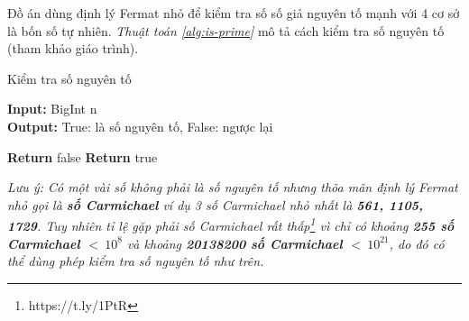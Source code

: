 Đồ án dùng định lý Fermat nhỏ để kiểm tra số số giả nguyên tố mạnh với 4 cơ sở là bốn số tự nhiên. \textit{Thuật toán \ref{alg:is-prime}} mô tả cách kiểm tra số nguyên 
tố (tham khảo giáo trình).

\begin{algorithm}
\caption{Kiểm tra số nguyên tố}\label{alg:is-prime}
\hspace*{\algorithmicindent} \textbf{Input:} BigInt n\\
\hspace*{\algorithmicindent} \textbf{Output:} True: là số nguyên tố, False: ngược lại 
\begin{algorithmic}[1]
\State \textbf{Return } false
\EndIf
\EndFor
\State \textbf{Return } true
\EndProcedure
\end{algorithmic}
\end{algorithm}

\textit{Lưu ý: Có một vài số không phải là số nguyên tố nhưng thõa mãn định lý Fermat nhỏ gọi là \textbf{số Carmichael} ví dụ 3 số Carmichael nhỏ nhất là \textbf{561, 1105, 1729}. Tuy nhiên tỉ lệ gặp phải số Carmichael rất thấp\footnote{https://t.ly/1PtR} vì chỉ có khoảng \textbf{255 số Carmichael $<\ 10^8$} và khoảng \textbf{20138200 số Carmichael $<\ 10^{21}$}, do đó có thể dùng phép kiểm tra số nguyên tố như trên.}